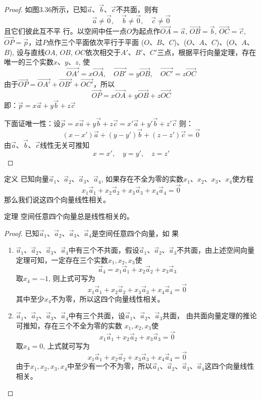 \begin{proof}
如图3.36所示，已知$\vec{a}$、$\vec{b}$、$\vec{c}$不共面，则有
\[\vec{a}\ne \vec{0},\quad \vec{b}\ne\vec{0},\quad \vec{c}\ne \vec{0}\]
且它们彼此互不平
行。以空间中任一点$O$为起点作$\Vec{OA}=\vec{a}$, $\Vec{OB}=\vec{b}$, $\Vec{OC}=\vec{c}$, $\Vec{OP}=\vec{p}$，过$P$点作三个平面依次平行于平面
($O$、$B$、$C$)、($O$、$A$、$C$)、($O$、$A$、$B$), 设与直线$OA$, $
OB$, $OC$依次相交于$A'$、$B'$、$C'$三点，根据平行向量定理，存在
唯一的三个实数$x$、$y$、$z$, 使
\[\Vec{OA'}=x\Vec{OA},\quad \Vec{OB'}=y\Vec{OB},\quad \Vec{OC'}=z\Vec{OC}\]
由于$\Vec{OP}=\Vec{OA'}+\Vec{OB'}+\Vec{OC'}$，所以
\[\Vec{OP}=x\Vec{OA}+y\Vec{OB}+z\Vec{OC}\]
即：$\vec{p}=x\vec{a}+y\vec{b}+z\vec{c}$

下面证唯一性：设$\vec{p}=x\vec{a}+y\vec{b}+z\vec{c}=x'\vec{a}+y'\vec{b}+z'\vec{c}$
则：
\[(x-x')\vec{a}+(y-y')\vec{b}+(z-z')\vec{c}=\vec{0}\]
由$\vec{a}$、$\vec{b}$、$\vec{c}$线性无关可推知
\[x=x',\quad y=y',\quad z=z'\]
\end{proof}

\begin{blk}
    {定义} 已知向量$\vec{a}_1$、$\vec{a}_2$、$\vec{a}_3$、$\vec{a}_4$, 如果存在不全为零的实数$x_1$、$x_2$、$x_3$、$x_4$使方程
    \[x_1\vec{a}_1+x_2\vec{a}_2+x_3\vec{a}_3+x_4\vec{a}_4=\vec{0}\]
    那么我们说这四个向量线性相关。
\end{blk}

\begin{blk}
    {定理}
空间任意四个向量总是线性相关的。
\end{blk}

\begin{proof}
    已知$\vec{a}_1$、$\vec{a}_2$、$\vec{a}_3$、$\vec{a}_4$是空间任意四个向量，如
果
\begin{enumerate}
    \item $\vec{a}_1$、$\vec{a}_2$、$\vec{a}_3$、$\vec{a}_4$中有三个不共面，假设$\vec{a}_1$、$\vec{a}_2$、$\vec{a}_3$不共面，由上述空间向量定理可知，一定存在三个实数$x_1,x_2,x_3$使
\[\vec{a}_4=x_1\vec{a}_1+x_2\vec{a}_2+x_3\vec{a}_3\]
取$x_4=-1$, 则上式可写为
\[x_1\vec{a}_1+x_2\vec{a}_2+x_3\vec{a}_3+x_4\vec{a}_4=\vec{0}\]
其中至少$x_4$不为零，所以这四个向量线性相关。
\item $\vec{a}_1$、$\vec{a}_2$、$\vec{a}_3$、$\vec{a}_4$中有三个共面，设$\vec{a}_1$、$\vec{a}_2$、$\vec{a}_3$共面，
由共面向量定理的推论可推知，存在三个不全为零的实数
$x_1,x_2,x_3$使
\[x_1\vec{a}_1+x_2\vec{a}_2+x_3\vec{a}_3=\vec{0}\]
取$x_4=0$, 上式就可写为
\[x_1\vec{a}_1+x_2\vec{a}_2+x_3\vec{a}_3+x_4\vec{a}_4=\vec{0}\]
由于$x_1,x_2,x_3,x_4$中至少有一个不为零，所以$\vec{a}_1$、$\vec{a}_2$、$\vec{a}_3$、$\vec{a}_4$这四个向量线性相关。
\end{enumerate}

\end{proof}


